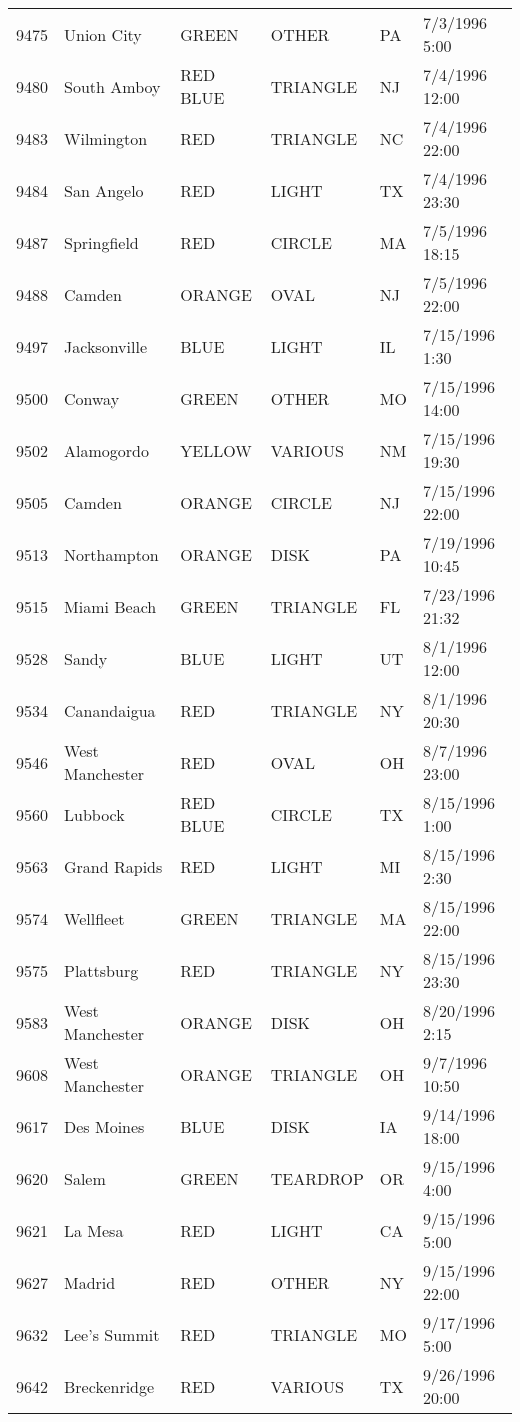 \begin{tabular}{llllll}
9475 & Union City & GREEN & OTHER & PA & 7/3/1996 5:00 \\
9480 & South Amboy & RED BLUE & TRIANGLE & NJ & 7/4/1996 12:00 \\
9483 & Wilmington & RED & TRIANGLE & NC & 7/4/1996 22:00 \\
9484 & San Angelo & RED & LIGHT & TX & 7/4/1996 23:30 \\
9487 & Springfield & RED & CIRCLE & MA & 7/5/1996 18:15 \\
9488 & Camden & ORANGE & OVAL & NJ & 7/5/1996 22:00 \\
9497 & Jacksonville & BLUE & LIGHT & IL & 7/15/1996 1:30 \\
9500 & Conway & GREEN & OTHER & MO & 7/15/1996 14:00 \\
9502 & Alamogordo & YELLOW & VARIOUS & NM & 7/15/1996 19:30 \\
9505 & Camden & ORANGE & CIRCLE & NJ & 7/15/1996 22:00 \\
9513 & Northampton & ORANGE & DISK & PA & 7/19/1996 10:45 \\
9515 & Miami Beach & GREEN & TRIANGLE & FL & 7/23/1996 21:32 \\
9528 & Sandy & BLUE & LIGHT & UT & 8/1/1996 12:00 \\
9534 & Canandaigua & RED & TRIANGLE & NY & 8/1/1996 20:30 \\
9546 & West Manchester & RED & OVAL & OH & 8/7/1996 23:00 \\
9560 & Lubbock & RED BLUE & CIRCLE & TX & 8/15/1996 1:00 \\
9563 & Grand Rapids & RED & LIGHT & MI & 8/15/1996 2:30 \\
9574 & Wellfleet & GREEN & TRIANGLE & MA & 8/15/1996 22:00 \\
9575 & Plattsburg & RED & TRIANGLE & NY & 8/15/1996 23:30 \\
9583 & West Manchester & ORANGE & DISK & OH & 8/20/1996 2:15 \\
9608 & West Manchester & ORANGE & TRIANGLE & OH & 9/7/1996 10:50 \\
9617 & Des Moines & BLUE & DISK & IA & 9/14/1996 18:00 \\
9620 & Salem & GREEN & TEARDROP & OR & 9/15/1996 4:00 \\
9621 & La Mesa & RED & LIGHT & CA & 9/15/1996 5:00 \\
9627 & Madrid & RED & OTHER & NY & 9/15/1996 22:00 \\
9632 & Lee's Summit & RED & TRIANGLE & MO & 9/17/1996 5:00 \\
9642 & Breckenridge & RED & VARIOUS & TX & 9/26/1996 20:00 \\

\end{tabular}
